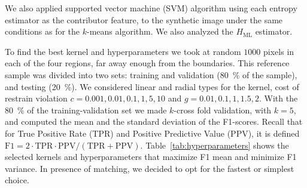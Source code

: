 \documentclass[journal]{IEEEtran}
\begin{document}

We also applied supported vector machine (SVM) algorithm using each entropy estimator as the contributor feature, to the synthetic image under the same conditions as for the $k$-means algorithm. We also analyzed the $H_{\text{ML}}$ estimator.

To find the best kernel and hyperparameters we took at random $1000$ pixels in each of the four regions, far away enough from the boundaries. 
This reference sample was divided into two sets:
training and validation (\SI{80}{\percent} of the sample), and
testing (\SI{20}{\percent}). 
We considered linear and radial types for the kernel, cost of restrain violation $c=0.001, 0.01, 0.1, 1, 5, 10$ and $g=0.01, 0.1, 1, 1.5, 2$. 
With the \SI{80}{\percent} of the training-validation set we made $k$-cross fold validation, with $k=5$, and computed the mean and the standard deviation of the F1-scores. Recall that for True Positive Rate (TPR) and Positive Predictive Value (PPV), it is defined $\textrm{F1}=2 \cdot \textrm{TPR} \cdot \textrm{PPV} / (\textrm{TPR} + \textrm{PPV})$.
Table~\ref{tab:hyperparameters} shows the selected kernels and hyperparameters that maximize F1 mean and minimize F1 variance. 
In presence of matching, we decided to opt for the fastest or simplest choice.



\end{document}
